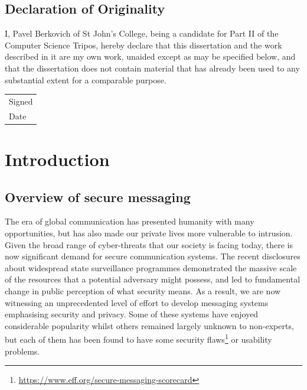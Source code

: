 \documentclass[a4paper, twoside, 12pt]{report}
\newcommand{\skippage}{\cleardoublepage}
\begin{document}
\pagebreak
\skippage

\section*{Declaration of Originality}
I, Pavel Berkovich of St John's College, being a candidate for Part II of the Computer Science Tripos, hereby declare that this dissertation and the work described in it are my own work, unaided except as may be specified below, and that the dissertation does not contain material that has already been used to any substantial extent for a comparable purpose. \\[0.8cm]
\begin{tabular}{l}
    Signed \\[0.8cm]
    Date
\end{tabular}
\vfill

\skippage

\tableofcontents

\skippage

\pagestyle{headings}

\chapter{Introduction}
\label{ch:intro}

\section{Overview of secure messaging}
\label{sec:intro.overview_sec_mess}
The era of global communication has presented humanity with many opportunities, but has also made our private lives more vulnerable to intrusion. Given the broad range of cyber-threats that our society is facing today, there is now significant demand for secure communication systems. The recent disclosures about widespread state surveillance programmes demonstrated the massive scale of the resources that a potential adversary might possess, and led to fundamental change in public perception of what security means. As a result, we are now witnessing an unprecedented level of effort to develop messaging systems emphasising security and privacy. Some of these systems have enjoyed considerable popularity whilst others remained largely unknown to non-experts, but each of them has been found to have some security flaws\footnote{\url{https://www.eff.org/secure-messaging-scorecard}} or usability problems.\\
\end{document}
